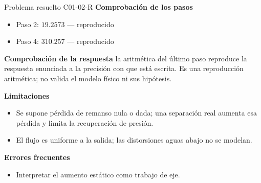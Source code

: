 \documentclass[10pt,openany]{book}
\begin{document}
\begin{studiumworked}{Problema resuelto C01-02-R}
\noindent\textbf{Comprobación de los pasos}
\begin{itemize}
\item Paso 2: $19.2573$ — reproducido
\item Paso 4: $310.257$ — reproducido
\end{itemize}

\noindent\textbf{Comprobación de la respuesta} la aritmética del último paso reproduce la respuesta enunciada a la precisión con que está escrita. Es una reproducción aritmética; no valida el modelo físico ni sus hipótesis.

\noindent\textbf{Limitaciones}
\begin{itemize}
\item Se supone pérdida de remanso nula o dada; una separación real aumenta esa pérdida y limita la recuperación de presión.
\item El flujo es uniforme a la salida; las distorsiones aguas abajo no se modelan.
\end{itemize}

\noindent\textbf{Errores frecuentes}
\begin{itemize}
\item Interpretar el aumento estático como trabajo de eje.
\end{itemize}
\end{studiumworked}
\end{document}
